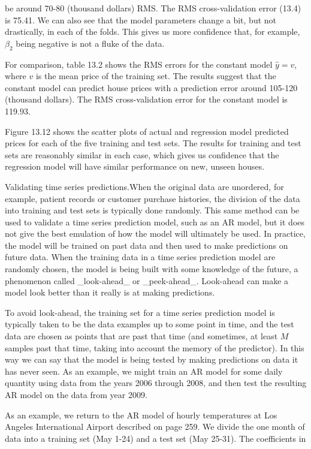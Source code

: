 be around 70-80 (thousand dollars) RMS. The RMS cross-validation error (13.4) is 75.41. We can also see that the model parameters change a bit, but not drastically, in each of the folds. This gives us more confidence that, for example, \(\beta_{2}\) being negative is not a fluke of the data.

For comparison, table 13.2 shows the RMS errors for the constant model \(\hat{y}=v\), where \(v\) is the mean price of the training set. The results suggest that the constant model can predict house prices with a prediction error around 105-120 (thousand dollars). The RMS cross-validation error for the constant model is 119.93.

Figure 13.12 shows the scatter plots of actual and regression model predicted prices for each of the five training and test sets. The results for training and test sets are reasonably similar in each case, which gives us confidence that the regression model will have similar performance on new, unseen houses.

Validating time series predictions.When the original data are unordered, for example, patient records or customer purchase histories, the division of the data into training and test sets is typically done randomly. This same method can be used to validate a time series prediction model, such as an AR model, but it does not give the best emulation of how the model will ultimately be used. In practice, the model will be trained on past data and then used to make predictions on future data. When the training data in a time series prediction model are randomly chosen, the model is being built with some knowledge of the future, a phenomenon called _look-ahead_ or _peek-ahead_. Look-ahead can make a model look better than it really is at making predictions.

To avoid look-ahead, the training set for a time series prediction model is typically taken to be the data examples up to some point in time, and the test data are chosen as points that are past that time (and sometimes, at least \(M\) samples past that time, taking into account the memory of the predictor). In this way we can say that the model is being tested by making predictions on data it has never seen. As an example, we might train an AR model for some daily quantity using data from the years 2006 through 2008, and then test the resulting AR model on the data from year 2009.

As an example, we return to the AR model of hourly temperatures at Los Angeles International Airport described on page 259. We divide the one month of data into a training set (May 1-24) and a test set (May 25-31). The coefficients in

